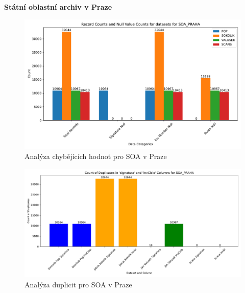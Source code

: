 \newpage
\noindent\textbf{Státní oblastní archiv v Praze}\\

\begin{figure}[htbp]
\centering
    \includegraphics[scale=.5]{obrazky-figures/dataAnalysis/soaPraha/missingValues.pdf}
    \caption{Analýza chybějících hodnot pro SOA v Praze}
\end{figure}

\begin{figure}[htbp]
\centering
    \includegraphics[scale=.5]{obrazky-figures/dataAnalysis/soaPraha/duplicities.pdf}
    \caption{Analýza duplicit pro SOA v Praze}
\end{figure}


